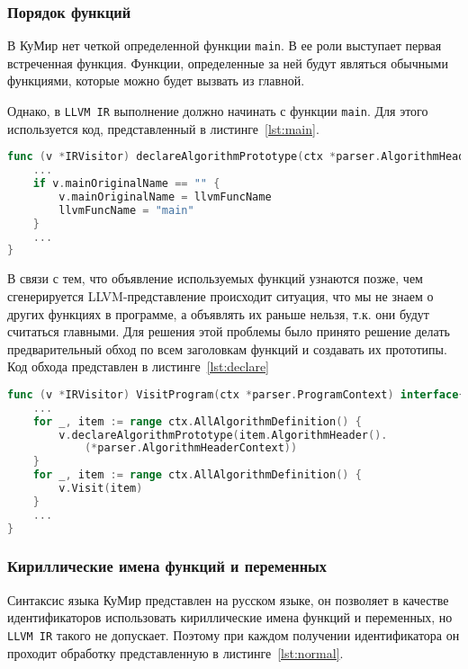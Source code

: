 \subsubsection*{Порядок функций}

В КуМир нет четкой определенной функции \texttt{main}. В ее роли выступает первая встреченная функция. Функции, определенные за ней будут являться обычными функциями, которые можно будет вызвать из главной. 

Однако, в \texttt{LLVM IR} выполнение должно начинать с функции \texttt{main}. Для этого используется код, представленный в листинге~\ref{lst:main}.

\begin{lstlisting}[language=go, caption={Определение main-функции}, label=lst:main]
func (v *IRVisitor) declareAlgorithmPrototype(ctx *parser.AlgorithmHeaderContext) {
    ... 
	if v.mainOriginalName == "" {
		v.mainOriginalName = llvmFuncName
		llvmFuncName = "main"
	}
    ...
}
\end{lstlisting}

В связи с тем, что объявление используемых функций узнаются позже, чем сгенерируется LLVM-представление происходит ситуация, что мы не знаем о других функциях в программе, а объявлять их раньше нельзя, т.к. они будут считаться главными. Для решения этой проблемы было принято решение делать предварительный обход по всем заголовкам функций и создавать их прототипы. Код обхода представлен в листинге~\ref{lst:declare}

\begin{lstlisting}[language=go, caption={Обход по заголовкам функций}, label=lst:declare]
func (v *IRVisitor) VisitProgram(ctx *parser.ProgramContext) interface{} {
    ...
	for _, item := range ctx.AllAlgorithmDefinition() {
		v.declareAlgorithmPrototype(item.AlgorithmHeader().
            (*parser.AlgorithmHeaderContext))
	}
	for _, item := range ctx.AllAlgorithmDefinition() {
		v.Visit(item)
	}
    ...
}
\end{lstlisting}

\subsubsection*{Кириллические имена функций и переменных}

Синтаксис языка КуМир представлен на русском языке, он позволяет в качестве идентификаторов использовать кириллические имена функций и переменных, но \texttt{LLVM IR} такого не допускает. Поэтому при каждом получении идентификатора он проходит обработку представленную в листинге~\ref{lst:normal}.

